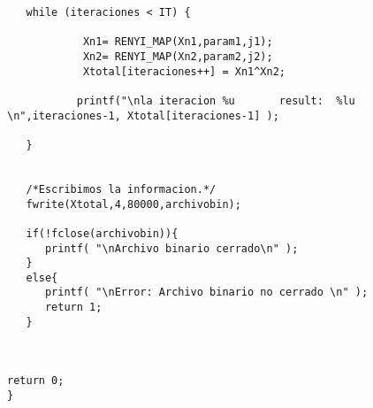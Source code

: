 \documentclass[12pt,3p]{elsarticle}
\begin{document}
\begin{verbatim}
   while (iteraciones < IT) {

            Xn1= RENYI_MAP(Xn1,param1,j1);
            Xn2= RENYI_MAP(Xn2,param2,j2);
            Xtotal[iteraciones++] = Xn1^Xn2;
 
           printf("\nla iteracion %u       result:  %lu   \n",iteraciones-1, Xtotal[iteraciones-1] );

   } 
 

   /*Escribimos la informacion.*/
   fwrite(Xtotal,4,80000,archivobin); 

   if(!fclose(archivobin)){
      printf( "\nArchivo binario cerrado\n" );
   }
   else{
      printf( "\nError: Archivo binario no cerrado \n" );
      return 1;
   }  

  

return 0;
}
\end{verbatim}
\end{document}
